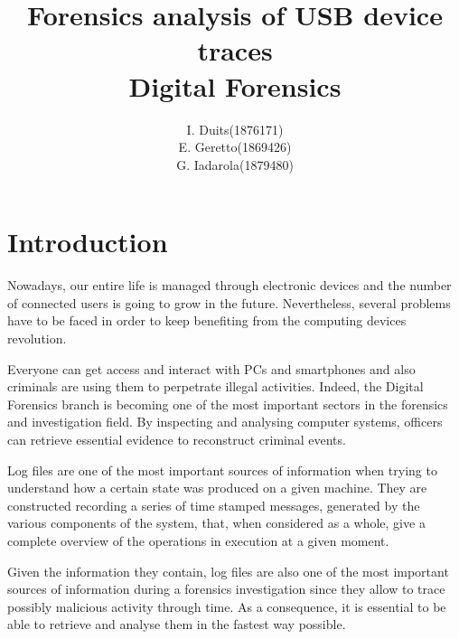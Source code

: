 \documentclass[a4paper,twocolumn]{article}
\title{Forensics analysis of USB device traces\\
\large Digital Forensics}
\author{
\begin{tabular}{>{\raggedleft}m{5cm}m{5cm}}
I. Duits & (1876171) \\
E. Geretto & (1869426) \\
G. Iadarola & (1879480) \\
\end{tabular}
}
\begin{document}
\maketitle


\section{Introduction}
\label{sec:intro}
Nowadays, our entire life is managed through electronic devices and the number
of connected users is going to grow in the future. Nevertheless, several
problems have to be faced in order to keep benefiting from the computing devices
revolution.

Everyone can get access and interact with PCs and smartphones and also criminals
are using them to perpetrate illegal activities. Indeed, the Digital Forensics
branch is becoming one of the most important sectors in the forensics and
investigation field. By inspecting and analysing computer systems, officers can
retrieve essential evidence to reconstruct criminal events.

Log files are one of the most important sources of information when trying to
understand how a certain state was produced on a given machine. They are
constructed recording a series of time stamped messages, generated by the
various components of the system, that, when considered as a whole, give a
complete overview of the operations in execution at a given moment.

Given the information they contain, log files are also one of the most important
sources of information during a forensics investigation since they allow to
trace possibly malicious activity through time. As a consequence, it is
essential to be able to retrieve and analyse them in the fastest way
possible.~\cite{finlayson1987log}
\end{document}
